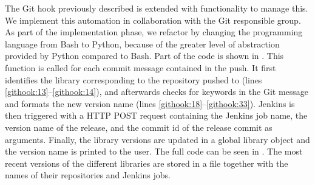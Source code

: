 The Git hook previously described is extended with functionality to manage this. We implement this automation in collaboration with the Git responsible group. As part of the implementation phase, we refactor by changing the programming language from Bash to Python, because of the greater level of abstraction provided by Python compared to Bash. Part of the code is shown in . This function is called for each commit message contained in the push. It first identifies the library corresponding to the repository pushed to (lines \ref{githook:13}--\ref{githook:14}), and afterwards checks for keywords in the Git message and formats the new version name (lines \ref{githook:18}--\ref{githook:33}). Jenkins is then triggered with a HTTP POST request containing the Jenkins job name, the version name of the release, and the commit id of the release commit as arguments. Finally, the library versions are updated in a global library object and the version name is printed to the user. The full code can be seen in . The most recent versions of the different libraries are stored in a file together with the names of their repositories and Jenkins jobs.

